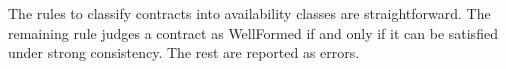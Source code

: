 

The rules to classify contracts into availability classes are straightforward.
The remaining rule judges a contract as {\sf WellFormed} if and only if it can
be satisfied under strong consistency. The rest are reported as errors.
